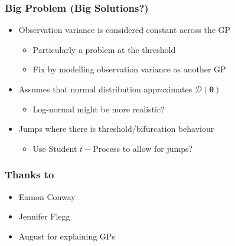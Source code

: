 \documentclass{beamer}
\begin{document}
\begin{frame}
\end{frame}

\begin{frame}
    \frametitle{Big Problem (Big Solutions?)}
    \begin{itemize}
        \item Observation variance is considered constant across the GP\begin{itemize}
                  \item Particularly a problem at the threshold
                  \item <2-> Fix by modelling observation variance as another GP
              \end{itemize}
              \item Assumes that normal distribution approximates $\mathcal{D}(\bm{\theta})$\begin{itemize}
                  \item Log-normal might be more realistic?
              \end{itemize}
              \item Jumps where there is threshold/bifurcation behaviour\begin{itemize}
                  \item Use Student $t-$Process to allow for jumps?
              \end{itemize}
    \end{itemize}
\end{frame}

\begin{frame}
    \frametitle{Thanks to}
    \begin{itemize}
        \item Eamon Conway
        \item Jennifer Flegg
        \item August for explaining GPs
    \end{itemize}
\end{frame}
\end{document}
